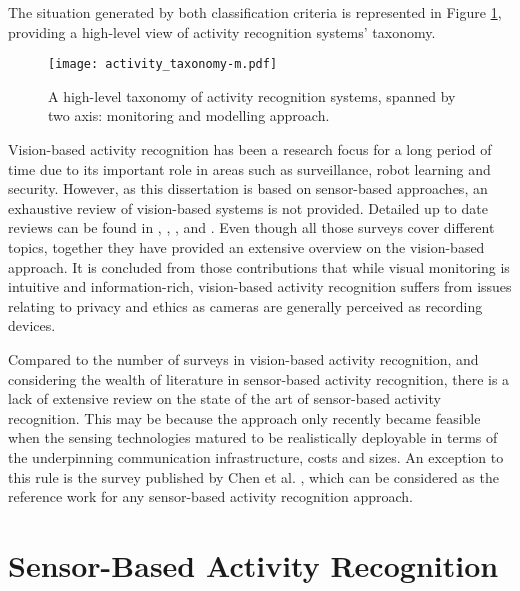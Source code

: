 The situation generated by both classification criteria is represented in Figure \ref{fig-classification}, providing a high-level view of activity recognition systems' taxonomy.

\begin{figure}[htbp]
\centering
\texttt{[image: activity\_taxonomy-m.pdf]}
    \caption{A high-level taxonomy of activity recognition systems, spanned by two axis: monitoring and modelling approach.}
    \label{fig-classification}
\end{figure}
 
Vision-based activity recognition has been a research focus for a long period of time due to its important role in areas such as surveillance, robot learning and security. However, as this dissertation is based on sensor-based approaches, an exhaustive review of vision-based systems is not provided. Detailed up to date reviews can be found in \cite{Poppe2010}, \cite{Moeslund2006}, \cite{Yilmaz2006}, \cite{Weinland2011} and \cite{Turaga2008}. Even though all those surveys cover different topics, together they have provided an extensive overview on the vision-based approach. It is concluded from those contributions that while visual monitoring is intuitive and information-rich, vision-based activity recognition suffers from issues relating to privacy and ethics \cite{Yilmaz2006} as cameras are generally perceived as recording devices.

Compared to the number of surveys in vision-based activity recognition, and considering the wealth of literature in sensor-based activity recognition, there is a lack of extensive review on the state of the art of sensor-based activity recognition. This may be because the approach only recently became feasible when the sensing technologies matured to be realistically deployable in terms of the underpinning communication infrastructure, costs and sizes. An exception to this rule is the survey published by Chen et al. \cite{Chen2012}, which can be considered as the reference work for any sensor-based activity recognition approach. 

\section{Sensor-Based Activity Recognition}
\label{sec:soa:sensor}


